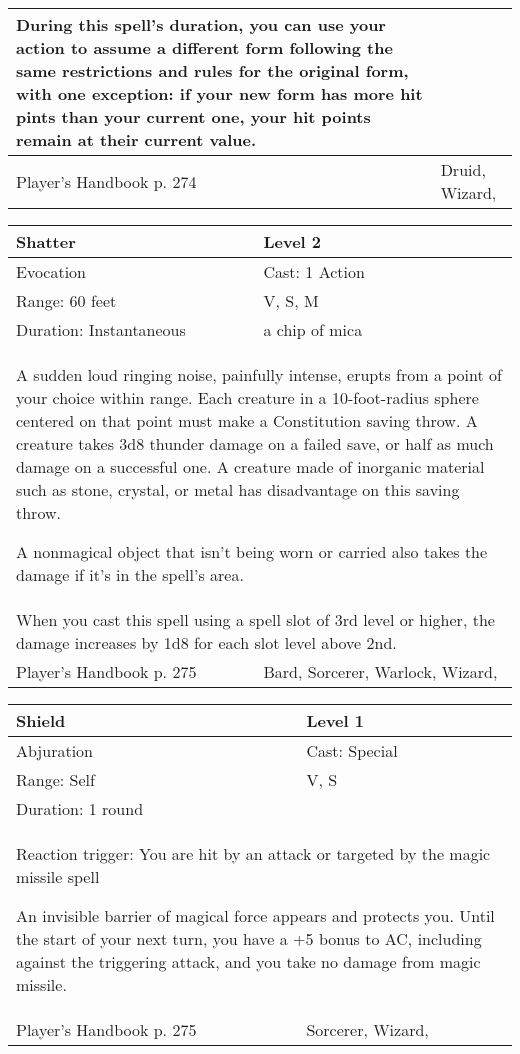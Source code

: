 \documentclass[11pt]{report}
\begin{document}
\begin{table}[H]
\begin{tabular}{||p{6cm}|p{6cm}||}
{During this spell’s duration, you can use your action to assume a different form following the same restrictions and rules for the original form, with one exception: if your new form has more hit pints than your current one, your hit points remain at their current value.}\\ \hline
Player's Handbook p. 274 & Druid, Wizard, \\ \hline\hline
	\end{tabular}
\end{table}

\begin{table}[H]
	\begin{tabular}{||p{6cm}|p{6cm}||}
		\hline\hline
		\bf{Shatter} & Level 2\\ \hline
		Evocation & Cast: 1 Action\\ \hline
		Range: 60 feet & V, S, M\\ \hline
		Duration: Instantaneous & a chip of mica\\ \hline
		\multicolumn{2}{||p{12cm}||}{A sudden loud ringing noise, painfully intense, erupts from a point of your choice within range. Each creature in a 10-foot-radius sphere centered on that point must make a Constitution saving throw. A creature takes 3d8 thunder damage on a failed save, or half as much damage on a successful one. A creature made of inorganic material such as stone, crystal, or metal has disadvantage on this saving throw.

A nonmagical object that isn’t being worn or carried also takes the damage if it’s in the spell’s area.}\\ \hline
		\multicolumn{2}{||p{12cm}||}{When you cast this spell using a spell slot of 3rd level or higher, the damage increases by 1d8 for each slot level above 2nd.}\\ \hline
Player's Handbook p. 275 & Bard, Sorcerer, Warlock, Wizard, \\ \hline\hline
	\end{tabular}
\end{table}

\begin{table}[H]
	\begin{tabular}{||p{6cm}|p{6cm}||}
		\hline\hline
		\bf{Shield} & Level 1\\ \hline
		Abjuration & Cast: Special\\ \hline
		Range: Self & V, S\\ \hline
		Duration: 1 round & \\ \hline
		\multicolumn{2}{||p{12cm}||}{Reaction trigger: You are hit by an attack or targeted by the magic missile spell

An invisible barrier of magical force appears and protects you. Until the start of your next turn, you have a +5 bonus to AC, including against the triggering attack, and you take no damage from magic missile.}\\ \hline
Player's Handbook p. 275 & Sorcerer, Wizard, \\ \hline\hline
	\end{tabular}
\end{table}
\end{document}
